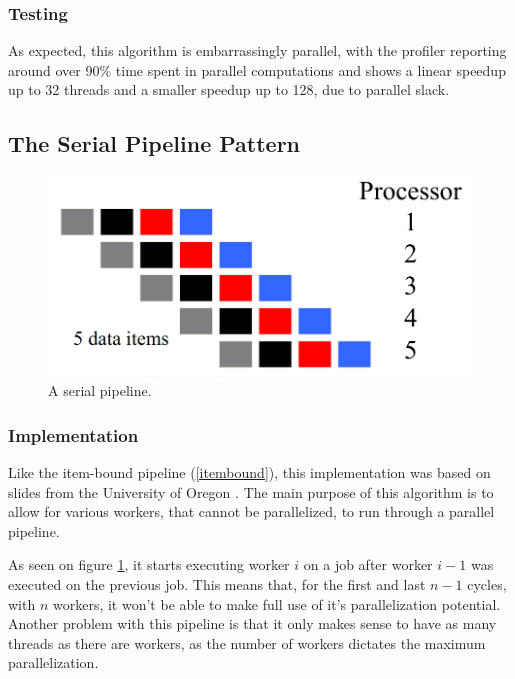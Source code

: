 \documentclass[10pt,journal]{IEEEtran}
\begin{document}
\subsubsection{Testing}

As expected, this algorithm is embarrassingly parallel, with the profiler reporting around over 90\% time spent in parallel computations and shows a linear speedup up to 32 threads and a smaller speedup up to 128, due to parallel slack.

\subsection{The Serial Pipeline Pattern}

\begin{figure}[htbp]
	\centerline{\includegraphics[scale=0.12]{img/serialpipeline.png}}
	\caption{ A serial pipeline. \cite{pipelineoregon} }
	\label{serialpipe}
\end{figure}

\subsubsection{Implementation}

Like the item-bound pipeline (\ref{itembound}), this implementation was based on slides from the University of Oregon \cite{pipelineoregon}. The main purpose of this algorithm is to allow for various workers, that cannot be parallelized, to run through a parallel pipeline. 

As seen on figure \ref{serialpipe}, it starts executing worker $ i $ on a job after worker $ i - 1 $ was executed on the previous job. This means that, for the first and last $ n - 1 $ cycles, with $ n $ workers, it won't be able to make full use of it's parallelization potential. Another problem with this pipeline is that it only makes sense to have as many threads as there are workers, as the number of workers dictates the maximum parallelization.
\end{document}
